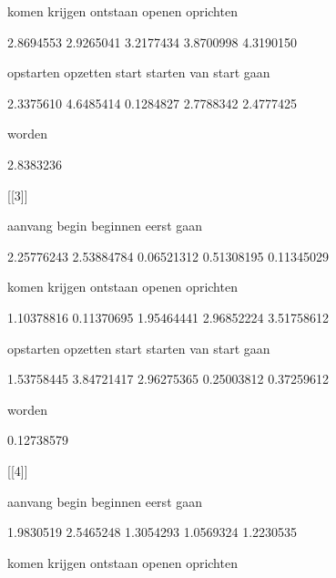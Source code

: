          komen        krijgen       ontstaan         openen      oprichten 



     2.8694553      2.9265041      3.2177434      3.8700998      4.3190150 



     opstarten       opzetten          start        starten van start gaan 



     2.3375610      4.6485414      0.1284827      2.7788342      2.4777425 



        worden 



     2.8383236 



[[3]]



       aanvang          begin       beginnen          eerst           gaan 



    2.25776243     2.53884784     0.06521312     0.51308195     0.11345029 



         komen        krijgen       ontstaan         openen      oprichten 



    1.10378816     0.11370695     1.95464441     2.96852224     3.51758612 



     opstarten       opzetten          start        starten van start gaan 



    1.53758445     3.84721417     2.96275365     0.25003812     0.37259612 



        worden 



    0.12738579 



[[4]]



       aanvang          begin       beginnen          eerst           gaan 



     1.9830519      2.5465248      1.3054293      1.0569324      1.2230535 



         komen        krijgen       ontstaan         openen      oprichten 



